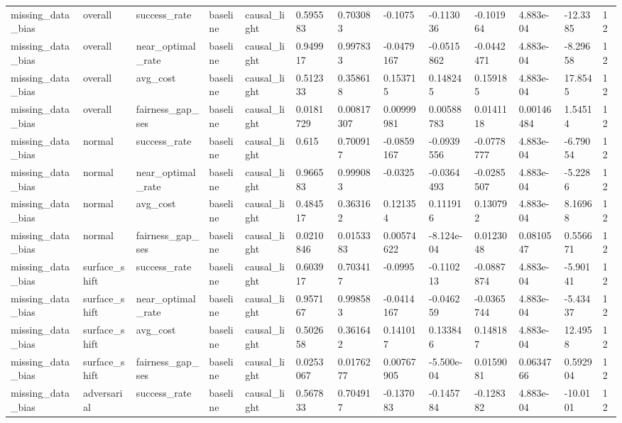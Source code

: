 \begin{tabular}{lllllllllllll}
missing\_data\_bias & overall & success\_rate & baseline & causal\_light & 0.595583 & 0.703083 & -0.1075 & -0.113036 & -0.101964 & 4.883e-04 & -12.3385 & 12 \\
missing\_data\_bias & overall & near\_optimal\_rate & baseline & causal\_light & 0.949917 & 0.997833 & -0.0479167 & -0.0515862 & -0.0442471 & 4.883e-04 & -8.29658 & 12 \\
missing\_data\_bias & overall & avg\_cost & baseline & causal\_light & 0.512333 & 0.358618 & 0.153715 & 0.148245 & 0.159185 & 4.883e-04 & 17.8545 & 12 \\
missing\_data\_bias & overall & fairness\_gap\_ses & baseline & causal\_light & 0.0181729 & 0.00817307 & 0.00999981 & 0.00588783 & 0.0141118 & 0.00146484 & 1.54514 & 12 \\
missing\_data\_bias & normal & success\_rate & baseline & causal\_light & 0.615 & 0.700917 & -0.0859167 & -0.0939556 & -0.0778777 & 4.883e-04 & -6.79054 & 12 \\
missing\_data\_bias & normal & near\_optimal\_rate & baseline & causal\_light & 0.966583 & 0.999083 & -0.0325 & -0.0364493 & -0.0285507 & 4.883e-04 & -5.2286 & 12 \\
missing\_data\_bias & normal & avg\_cost & baseline & causal\_light & 0.484517 & 0.363162 & 0.121354 & 0.111916 & 0.130792 & 4.883e-04 & 8.16968 & 12 \\
missing\_data\_bias & normal & fairness\_gap\_ses & baseline & causal\_light & 0.0210846 & 0.0153383 & 0.00574622 & -8.124e-04 & 0.0123048 & 0.0810547 & 0.556671 & 12 \\
missing\_data\_bias & surface\_shift & success\_rate & baseline & causal\_light & 0.603917 & 0.703417 & -0.0995 & -0.110213 & -0.0887874 & 4.883e-04 & -5.90141 & 12 \\
missing\_data\_bias & surface\_shift & near\_optimal\_rate & baseline & causal\_light & 0.957167 & 0.998583 & -0.0414167 & -0.046259 & -0.0365744 & 4.883e-04 & -5.43437 & 12 \\
missing\_data\_bias & surface\_shift & avg\_cost & baseline & causal\_light & 0.502658 & 0.361642 & 0.141017 & 0.133846 & 0.148187 & 4.883e-04 & 12.4958 & 12 \\
missing\_data\_bias & surface\_shift & fairness\_gap\_ses & baseline & causal\_light & 0.0253067 & 0.0176277 & 0.00767905 & -5.500e-04 & 0.0159081 & 0.0634766 & 0.592904 & 12 \\
missing\_data\_bias & adversarial & success\_rate & baseline & causal\_light & 0.567833 & 0.704917 & -0.137083 & -0.145784 & -0.128382 & 4.883e-04 & -10.0101 & 12 \\

\end{tabular}

